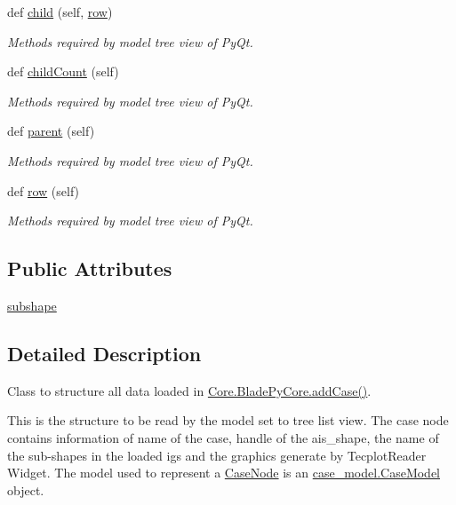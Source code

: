 \begin{DoxyCompactItemize}
def \hyperlink{classdata__structure_1_1case__node_1_1_case_node_ac5303eb8bbab69954feaa7205ba778aa}{child} (self, \hyperlink{classdata__structure_1_1case__node_1_1_case_node_a5ffe67a35812f868b49b833deeae9e60}{row})
\begin{DoxyCompactList}\small\item\em Methods required by model tree view of Py\+Qt. \end{DoxyCompactList}\item 
def \hyperlink{classdata__structure_1_1case__node_1_1_case_node_a1151098cb931c0dac5e36b5a430ee831}{child\+Count} (self)
\begin{DoxyCompactList}\small\item\em Methods required by model tree view of Py\+Qt. \end{DoxyCompactList}\item 
def \hyperlink{classdata__structure_1_1case__node_1_1_case_node_a130f184f648103908a74a8a332f7513f}{parent} (self)
\begin{DoxyCompactList}\small\item\em Methods required by model tree view of Py\+Qt. \end{DoxyCompactList}\item 
def \hyperlink{classdata__structure_1_1case__node_1_1_case_node_a5ffe67a35812f868b49b833deeae9e60}{row} (self)
\begin{DoxyCompactList}\small\item\em Methods required by model tree view of Py\+Qt. \end{DoxyCompactList}\end{DoxyCompactItemize}
\subsection*{Public Attributes}
\begin{DoxyCompactItemize}
\item 
\hyperlink{classdata__structure_1_1case__node_1_1_case_node_ac2f5b0ae9715edeac8f9b1ccc0fd64e3}{subshape}
\end{DoxyCompactItemize}


\subsection{Detailed Description}
Class to structure all data loaded in \hyperlink{class_core_1_1_blade_py_core_a1a62f9b5b8f5929bdb6f0a8c27049d9e}{Core.\+Blade\+Py\+Core.\+add\+Case()}. 

This is the structure to be read by the model set to tree list view. The case node contains information of name of the case, handle of the ais\+\_\+shape, the name of the sub-\/shapes in the loaded igs and the graphics generate by Tecplot\+Reader Widget. The model used to represent a \hyperlink{classdata__structure_1_1case__node_1_1_case_node}{Case\+Node} is an \hyperlink{classdata__structure_1_1case__model_1_1_case_model}{case\+\_\+model.\+Case\+Model} object. 


